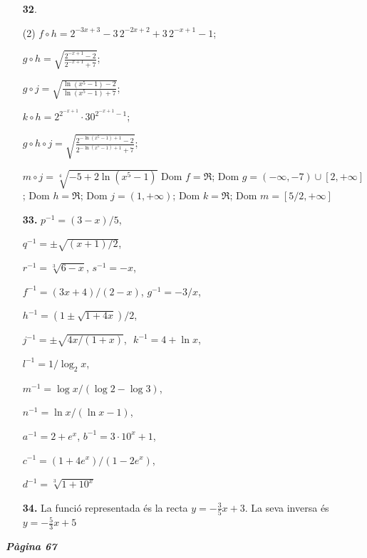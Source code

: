 \documentclass[a4paper, pdf, twoside]{book}
\begin{document}
\begin{multicols}{2}
\begin{enumerate}
 \item[\fontfamily{phv}\selectfont\color{blue}\textbf{32}. ] 
 \begin{tasks}[column-sep=1em, item-indent=1.3333em](2)
	 \task* $f\circ h=2^{-3x+3}-3\,2^{-2x+2}+3\,2^{-x+1}-1$;\par $g\circ h=\sqrt {\frac {2^{-x+1}-2}{2^{-x+1}+7}}$;\par $g\circ j=\sqrt {\frac {\ln (x^5-1)-2}{\ln (x^5-1)+7}}$;\par $k\circ h=2^{2^{-x+1}}\cdot 30^{2^{-x+1}-1}$;\par $g\circ h \circ j=\sqrt {\frac {2^{-\ln (x^5-1)+1}-2}{2^{-\ln (x^5-1)+1}+7}}$;\par $m\circ j=\sqrt [4]{-5+2\ln (x^5-1)}$
	 \task* Dom $f=\Re $; Dom $g=(-\infty ,-7)\cup [2,+\infty ]$; Dom $h=\Re $; Dom $j=(1,+\infty )$; Dom $k=\Re $; Dom $m=[5/2,+\infty ]$
\end{tasks}
 \end{enumerate}
\begin{enumerate}
\vspace{0.25cm}
\item[\fontfamily{phv}\selectfont\color{blue}\textbf{33. }]  \scalebox{0.6}{\simbolclau } 
$p^{-1}=(3-x)/5$,\par $q^{-1}=\pm \sqrt {(x+1)/2}$,\par $r^{-1}=\sqrt [3]{6-x}$, $s^{-1}=-x$,\par $f^{-1}=(3x+4)/(2-x)$, $g^{-1}=-3/x$,\par $h^{-1}=(1\pm \sqrt {1+4x})/2$,\par $j^{-1}=\pm \sqrt {4x/(1+x)}$, \,\,$k^{-1}=4+\ln x$,\par $l^{-1}=1/\log _2 {x}$,\par $m^{-1}=\log x /(\log 2 - \log 3)$,\par $n^{-1}=\ln x / (\ln x -1)$,\par $a^{-1}=2+e^x$, $b^{-1}=3\cdot 10^x +1$,\par $c^{-1}=(1+4 e^x)/(1-2 e^x)$,\par $d^{-1}=\sqrt [3]{1+10^x}$ 
\vspace{0.25cm}
\item[\fontfamily{phv}\selectfont\color{blue}\textbf{34. }] 
La funció representada és la recta $y=-\frac {3}{5}x+3$. La seva inversa és $y=-\frac {5}{3}x+5$
 \end{enumerate}
\vspace{0.3cm}


{\textbf{\em Pàgina 67}} \hrulefill
\begin{enumerate}
\vspace{0.25cm}



\end{enumerate}
\end{multicols}
\end{document}
